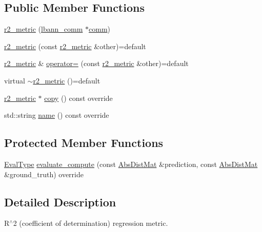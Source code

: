 \subsection*{Public Member Functions}
\begin{DoxyCompactItemize}
\item 
\hyperlink{classlbann_1_1r2__metric_a9c6bffbb4724c77a8e6f8b1a2e7b27c7}{r2\+\_\+metric} (\hyperlink{classlbann_1_1lbann__comm}{lbann\+\_\+comm} $\ast$\hyperlink{file__io_8cpp_ab048c6f9fcbcfaa57ce68b00263dbebe}{comm})
\item 
\hyperlink{classlbann_1_1r2__metric_a42a125bad0a3ba5e6b229d89b893d3e6}{r2\+\_\+metric} (const \hyperlink{classlbann_1_1r2__metric}{r2\+\_\+metric} \&other)=default
\item 
\hyperlink{classlbann_1_1r2__metric}{r2\+\_\+metric} \& \hyperlink{classlbann_1_1r2__metric_a83078b4784031fc91f7f145cf22e5571}{operator=} (const \hyperlink{classlbann_1_1r2__metric}{r2\+\_\+metric} \&other)=default
\item 
virtual \hyperlink{classlbann_1_1r2__metric_a9f2d864400bc44be329f7caf6d98cf01}{$\sim$r2\+\_\+metric} ()=default
\item 
\hyperlink{classlbann_1_1r2__metric}{r2\+\_\+metric} $\ast$ \hyperlink{classlbann_1_1r2__metric_a2536209f1d575b639ab351854d54f207}{copy} () const override
\item 
std\+::string \hyperlink{classlbann_1_1r2__metric_a66f9280c69b9b079d40b70b9c9c43ad9}{name} () const override
\end{DoxyCompactItemize}
\subsection*{Protected Member Functions}
\begin{DoxyCompactItemize}
\item 
\hyperlink{base_8hpp_a3266f5ac18504bbadea983c109566867}{Eval\+Type} \hyperlink{classlbann_1_1r2__metric_a06c84d7944d1d5be896de6b98950e05e}{evaluate\+\_\+compute} (const \hyperlink{base_8hpp_a9a697a504ae84010e7439ffec862b470}{Abs\+Dist\+Mat} \&prediction, const \hyperlink{base_8hpp_a9a697a504ae84010e7439ffec862b470}{Abs\+Dist\+Mat} \&ground\+\_\+truth) override
\end{DoxyCompactItemize}


\subsection{Detailed Description}
R$^\wedge$2 (coefficient of determination) regression metric. 

